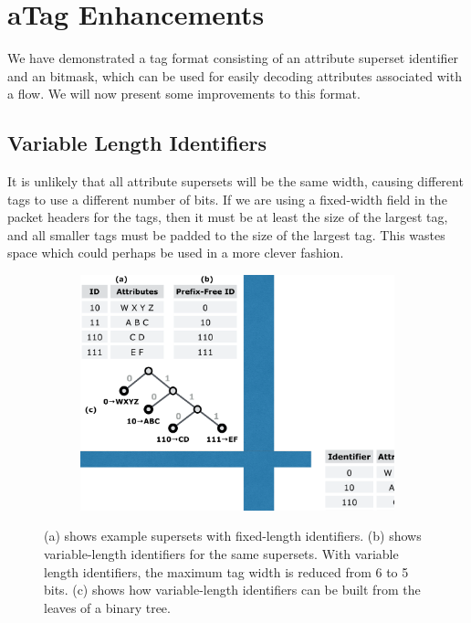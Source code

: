\section{aTag Enhancements}
We have demonstrated a tag format consisting of an attribute superset identifier and an bitmask, which can be used for easily decoding attributes associated with a flow. We will now present some improvements to this format.



\subsection{Variable Length Identifiers}
It is unlikely that all attribute supersets will be the same width, causing different tags to use a different number of bits. If we are using a fixed-width field in the packet headers for the tags, then it must be at least the size of the largest tag, and all smaller tags must be padded to the size of the largest tag. This wastes space which could perhaps be used in a more clever fashion.

\begin{figure}[t!] 
\begin{minipage}{1\linewidth}
\begin{subfigure}[c]{0.96\linewidth}
\includegraphics[trim={0 7cm 18cm 0}, clip, width=\linewidth]{figures/variable_identifiers}
\end{subfigure} 
\end{minipage} 
\caption{(a) shows example supersets with fixed-length identifiers. (b) shows variable-length identifiers for the same supersets. With variable length identifiers, the maximum tag width is reduced from 6 to 5 bits. (c) shows how variable-length identifiers can be built from the leaves of a binary tree.}
\label{fig:variable_id}
\end{figure}

